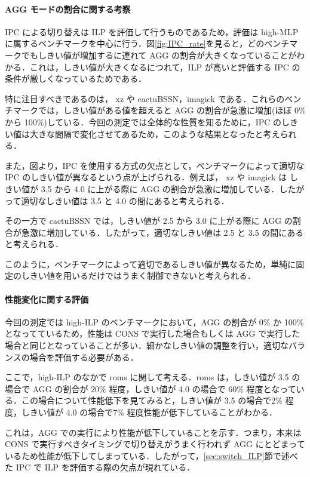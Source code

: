 \documentclass[twocolumn]{jsarticle}
\begin{document}
  \paragraph{AGG モードの割合に関する考察}
  IPC による切り替えは ILP を評価して行うものであるため，評価は high-MLP に属するベンチマークを中心に行う．図\ref{fig:IPC_rate}を見ると，どのベンチマークでもしきい値が増加するに連れて AGG の割合が大きくなっていることがわかる．これは，しきい値が大きくなるにつれて，ILP が高いと評価する IPC の条件が厳しくなっているためである．

  特に注目すべきであるのは， xz や cactuBSSN，imagick である．これらのベンチマークでは，しきい値がある値を超えると AGG の割合が急激に増加(ほぼ 0\% から 100\%)している．今回の測定では全体的な性質を知るために，IPC のしきい値は大きな間隔で変化させてあるため，このような結果となったと考えられる．

  また，図より，IPC を使用する方式の欠点として，ベンチマークによって適切な IPC のしきい値が異なるという点が上げられる．例えば， xz や imagick は しきい値が 3.5 から 4.0 に上がる際に AGG の割合が急激に増加している．したがって適切なしきい値は 3.5 と 4.0 の間にあると考えられる． 
  
  その一方で cactuBSSN では，しきい値が 2.5 から 3.0 に上がる際に AGG の割合が急激に増加している．したがって，適切なしきい値は 2.5 と 3.5 の間にあると考えられる．
  
  このように，ベンチマークによって適切であるしきい値が異なるため，単純に固定のしきい値を用いるだけではうまく制御できないと考えられる．

  \paragraph{性能変化に関する評価}
  今回の測定では high-ILP のベンチマークにおいて，AGG の割合が 0\% か 100\% となってているため，性能は CONS で実行した場合もしくは AGG で実行した場合と同じとなっていることが多い．細かなしきい値の調整を行い，適切なバランスの場合を評価する必要がある．

  ここで，high-ILP のなかで roms に関して考える．roms は，しきい値が 3.5 の場合で AGG の割合が 20\% 程度，しきい値が 4.0 の場合で 60\% 程度となっている．この場合について性能低下を見てみると，しきい値が 3.5 の場合で2\% 程度，しきい値が 4.0 の場合で7\% 程度性能が低下していることがわかる．
  
  これは，AGG での実行により性能が低下していることを示す．つまり，本来は CONS で実行すべきタイミングで切り替えがうまく行われず AGG にとどまっているため性能が低下してしまっている．したがって，\ref{sec:switch_ILP}節で述べた IPC で ILP を評価する際の欠点が現れている．
\end{document}
